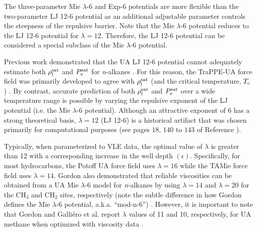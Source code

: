 \documentclass[preprint,letterpaper,floatfix,citeautoscript,aip,jcp]{revtex4-1}
\begin{document}
The three-parameter Mie $\lambda$-6 and Exp-6 potentials are more flexible than the two-parameter LJ 12-6 potential as an additional adjustable parameter controls the steepness of the repulsive barrier. Note that the Mie $\lambda$-6 potential reduces to the LJ 12-6 potential for $\lambda = 12$. Therefore, the LJ 12-6 potential can be considered a special subclass of the Mie $\lambda$-6 potential. 


Previous work demonstrated that the UA LJ 12-6 potential cannot adequately estimate both $\rho_{\rm l}^{\rm sat}$ and $P_{\rm v}^{\rm sat}$ for \textit{n}-alkanes \cite{Pareto_LJPQ,Mess4}. For this reason, the TraPPE-UA force field was primarily developed to agree with $\rho_{\rm l}^{\rm sat}$ (and the critical temperature, $T_{\rm c}$) \cite{TraPPE}. By contrast, accurate prediction of both $\rho_{\rm l}^{\rm sat}$ and $P_{\rm v}^{\rm sat}$ over a wide temperature range is possible by varying the repulsive exponent of the LJ potential (i.e. the Mie $\lambda$-6 potential). 
Although an attractive exponent of 6 has a strong theoretical basis, $\lambda = 12$ (LJ 12-6) is a historical artifact that was chosen primarily for computational purposes (see pages $18$, $140$ to $143$ of Reference ).

Typically, when parameterized to VLE data, the optimal value of $\lambda$ is greater than 12 with a corresponding increase in the well depth $(\epsilon)$. Specifically, for most hydrocarbons, the Potoff UA force field \cite{Mie,Potoff_branched} uses $\lambda = 16$ while the TAMie force field \cite{TAMie} uses $\lambda = 14$. Gordon also demonstrated that reliable viscosities can be obtained from a UA Mie $\lambda$-6 model for \textit{n}-alkanes by using $\lambda = 14$ and $\lambda = 20$ for the CH$_3$ and CH$_2$ sites, respectively (note the subtle difference in how Gordon defines the Mie $\lambda$-6 potential, a.k.a. ``mod-n-6'') \cite{Gordon2006}. 
However, it is important to note that Gordon and Galli{\'e}ro et al. report $\lambda$ values of 11 and 10, respectively, for UA methane when optimized with viscosity data \cite{Gordon2006,Galliero2005}.

\end{document}
